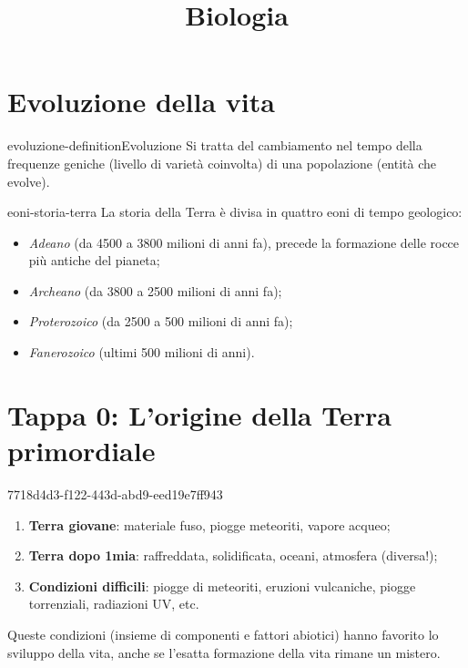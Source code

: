 \documentclass[preview]{standalone}
\begin{document}
\title{Biologia}
\genpage

\section{Evoluzione della vita}

\begin{snippetdefinition}{evoluzione-definition}{Evoluzione}
    Si tratta del cambiamento nel tempo della frequenze geniche (livello di varietà coinvolta)
    di una popolazione (entità che evolve).
\end{snippetdefinition}

\begin{snippet}{eoni-storia-terra}
    La storia della Terra è divisa in quattro eoni di tempo geologico:
    \begin{itemize}
        \item \textit{Adeano} (da 4500 a 3800 milioni di anni fa), precede
        la formazione delle rocce più antiche del pianeta;
        \item \textit{Archeano} (da 3800 a 2500 milioni di anni fa);
        \item \textit{Proterozoico} (da 2500 a 500 milioni di anni fa);
        \item \textit{Fanerozoico} (ultimi 500 milioni di anni).
    \end{itemize}
\end{snippet}


\section{Tappa 0: L'origine della Terra primordiale}

\begin{snippet}{7718d4d3-f122-443d-abd9-eed19e7ff943}
    \begin{enumerate}
        \item \textbf{Terra giovane}: materiale fuso, piogge meteoriti, vapore acqueo;
        \item \textbf{Terra dopo 1mia}: raffreddata, solidificata, oceani, atmosfera (diversa!);
        \item \textbf{Condizioni difficili}: piogge di meteoriti, eruzioni vulcaniche, piogge torrenziali, radiazioni UV, etc.
    \end{enumerate}

    Queste condizioni (insieme di componenti e fattori abiotici) hanno
    favorito lo sviluppo della vita, anche se l'esatta formazione della vita rimane un mistero.
\end{snippet}
\end{document}
